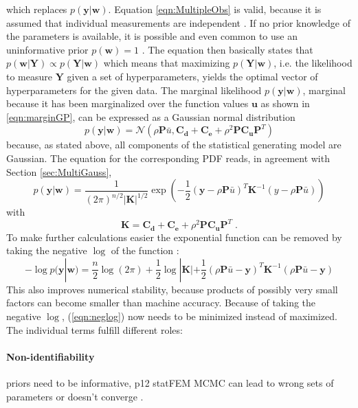 \documentclass[%
  a4paper,oneside,%
  11pt,%
  smallchapters,
  style=printdev,
  extramargin,
  green,%
  rgb, <cmyk>
  ]{tubsbook}
\begin{document}
which replaces $p(\bm{y}|\bm{w})$.
Equation \eqref{eqn:MultipleObs} is valid, because it is assumed that individual measurements are independent \cite[p.9]{rasmussen2006}.
If no prior knowledge of the parameters is available, it is possible and even common to use an uninformative prior $p(\bm{w}) = 1$ \cite[p.433]{kennedy2001}. 
The equation then basically states that $p(\bm{w}|\bm{Y}) \propto p(\bm{Y}|\bm{w})$ which means that maximizing  $p(\bm{Y}|\bm{w})$, i.e. the likelihood to measure $\bm{Y}$ given a set of hyperparameters, yields the optimal vector of hyperparameters for the given data. 
The marginal likelihood $p(\bm{y}|\bm{w})$, marginal because it has been marginalized over the function values $\bm{u}$ as shown in \eqref{eqn:marginGP}, can be expressed as a Gaussian normal distribution
\begin{equation}
p(\bm{y}|\bm{w}) = \mathcal{N}(\rho \bm{P}\bar{u}, \bm{C_d}+\bm{C_e} + \rho^2 \bm{P} \bm{C_u} \bm{P}^T)
\end{equation}
because, as stated above, all components of the statistical generating model are Gaussian.
The equation for the corresponding PDF reads, in agreement with Section \ref{sec:MultiGauss},
\begin{equation}
p(\bm{y}|\bm{w}) = \frac{1}{(2 \pi)^{n/2} |\bm{K}|^{1/2} } \exp \left(   -\frac{1}{2} (\bm{y} - \rho \bm{P}\bar{u})^T \bm{K}^{-1} (y - \rho \bm{P}\bar{u})   \right)
\end{equation}
with
\begin{equation}
\bm{K} = \bm{C_d}+\bm{C_e} + \rho^2 \bm{P} \bm{C_u} \bm{P}^T \; .
\end{equation}
%
To make further calculations easier the exponential function can be removed by taking the negative $\log$ of the function \cite[p.113]{rasmussen2006}:
\begin{equation}
- \log p(\bm{y}|\bm{w}) = \frac{n}{2} \log(2 \pi) + \frac{1}{2} \log |\bm{K}| + \frac{1}{2}(\rho \bm{P}\bar{u} - \bm{y})^T \bm{K}^{-1} (\rho \bm{P}\bar{u} - \bm{y}) 
\label{eqn:neglog}
\end{equation}
This also improves numerical stability, because products of possibly very small factors can become smaller than machine accuracy. 
Because of taking the negative $\log$, (\ref{eqn:neglog}) now needs to be minimized instead of maximized. 
The individual terms fulfill different roles: 

\paragraph{Non-identifiability}
priors need to be informative, p12 statFEM
\cite{Eberly2000} MCMC can lead to wrong sets of parameters or doesn't converge \cite{Bayarri} \cite{kennedy2001}.
\end{document}
